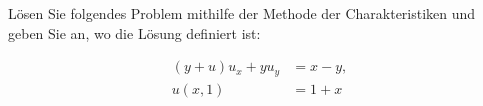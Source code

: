 
\begin{exercise}

Lösen Sie folgendes Problem mithilfe der Methode der Charakteristiken und geben Sie an, wo die Lösung definiert ist:

\begin{align*}
    (y + u) u_x + y u_y
    & =
    x - y, \\
    u(x, 1)
    & =
    1 + x
\end{align*}

\end{exercise}


%
%
%
%
%
%
